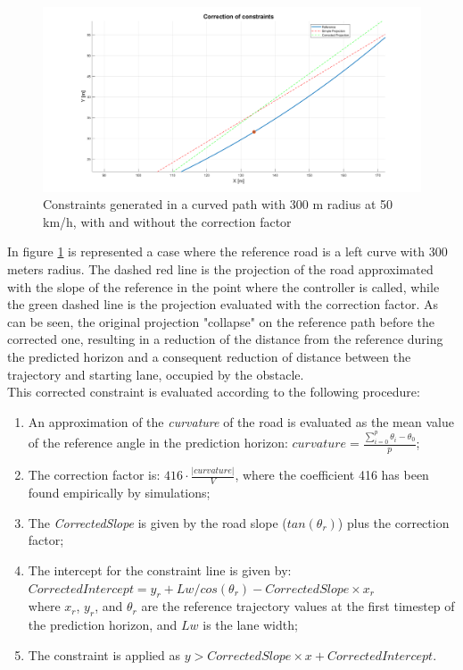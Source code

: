 \begin{figure}[H]
    \centering
    \includegraphics[width=1\textwidth]{Figures/ConstraintCorrection.png}
    \caption{Constraints generated in a curved path with 300 m radius at 50 km/h, with and without the correction factor}
      \label{fig:CorrectionConstraint}
\end{figure}
In figure \ref{fig:CorrectionConstraint} is represented a case where the reference road is a left curve with 300 meters radius. The dashed red line is the projection of the road approximated with the slope of the reference in the point where the controller is called, while the green dashed line is the projection evaluated with the correction factor. As can be seen, the original projection "collapse" on the reference path before the corrected one, resulting in a reduction of the distance from the reference during the predicted horizon and a consequent reduction of distance between the trajectory and starting lane, occupied by the obstacle.\\
This corrected constraint is evaluated according to the following procedure:
\begin{enumerate}
    \item An approximation of the \textit{curvature} of the road is evaluated as the mean value of the reference angle in the prediction horizon: $curvature = \frac{\sum_{i=0}^{p}\theta_i-\theta_0}{p}$;
    \item The correction factor is: $416\cdot\frac{|curvature|}{V}$, where the coefficient 416 has been found empirically by simulations;
    \item The \textit{CorrectedSlope} is given by the road slope ($tan(\theta_r)$) plus the correction factor;
    \item The intercept for the constraint line is given by:\\
    $CorrectedIntercept = y_r + Lw/cos(\theta_r) - CorrectedSlope\times x_r$\\
    where $x_r$, $y_r$, and $\theta_r$ are the reference trajectory values at the first timestep of the prediction horizon, and $Lw$ is the lane width;
    \item The constraint is applied as $y > CorrectedSlope\times x + CorrectedIntercept$.
\end{enumerate}
